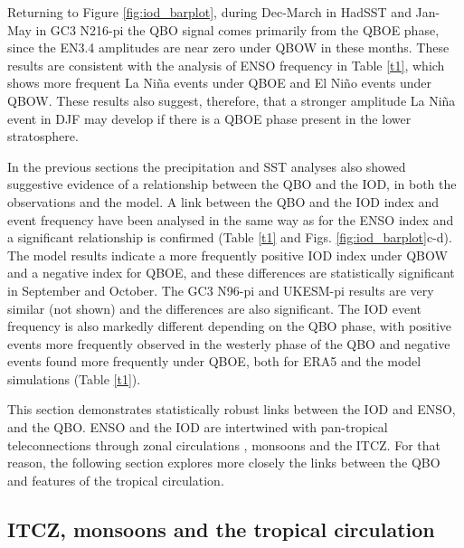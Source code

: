 Returning to Figure \ref{fig:iod_barplot}, during Dec-March in HadSST and Jan-May in GC3 N216-pi the QBO signal comes primarily from the QBOE phase, since the EN3.4 amplitudes are near zero under QBOW in these months. These results are consistent with the analysis of ENSO frequency in Table \ref{t1}, which shows more frequent La Niña events under QBOE and El Niño events under QBOW. These results also suggest, therefore, that a stronger amplitude La Niña event in DJF may develop if there is a QBOE phase present in the lower stratosphere.    

In the previous sections the precipitation and SST analyses also showed suggestive evidence  of a relationship between the QBO and the IOD, in both the observations and the  model. A link between the QBO and the IOD index and event frequency have been analysed in the same way as for the ENSO index and a significant relationship is confirmed (Table \ref{t1} and Figs. \ref{fig:iod_barplot}c-d). The model results indicate a more frequently positive IOD index under QBOW and a negative index for QBOE, and these differences are statistically  significant in September and October. The GC3 N96-pi and UKESM-pi results are very similar (not shown) and the differences are also significant. The IOD event frequency is also markedly different depending on the QBO phase, with positive events more frequently observed in the westerly phase of the QBO and negative events found more frequently under QBOE, both for ERA5 and the model simulations (Table \ref{t1}).
 
This section demonstrates statistically robust links between the IOD and ENSO, and the QBO. ENSO and the IOD are intertwined with pan-tropical teleconnections through zonal circulations \citep{cai2019pantropical}, monsoons and the ITCZ. For that reason, the following section explores more closely the links between the QBO and features of the tropical circulation. %



\subsection{ITCZ, monsoons and the tropical circulation}\label{sq:circ}

